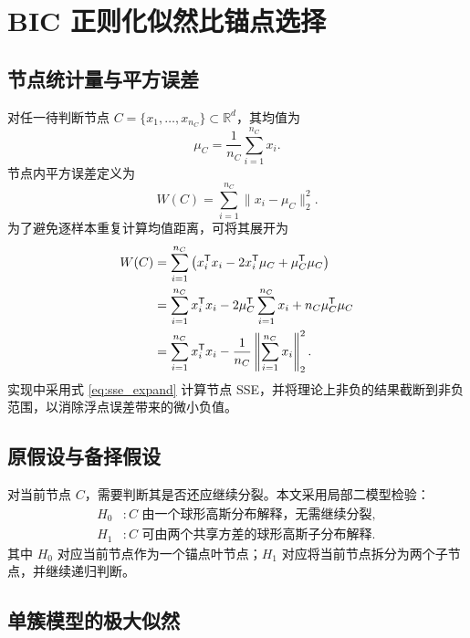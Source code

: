 \documentclass[UTF8,a4paper,12pt,fontset=none]{ctexart}
\newcommand{\R}{\mathbb{R}}
\newcommand{\T}{\mathsf{T}}
\begin{document}
\section{BIC 正则化似然比锚点选择}

\subsection{节点统计量与平方误差}

对任一待判断节点 \(C=\{x_1,\ldots,x_{n_C}\}\subset\R^d\)，其均值为
\begin{equation}
\mu_C=\frac{1}{n_C}\sum_{i=1}^{n_C}x_i .
\end{equation}
节点内平方误差定义为
\begin{equation}
W(C)=\sum_{i=1}^{n_C}\|x_i-\mu_C\|_2^2 .
\end{equation}
为了避免逐样本重复计算均值距离，可将其展开为
\begin{align}
W(C)
&=\sum_{i=1}^{n_C}
\left(x_i^\T x_i-2x_i^\T\mu_C+\mu_C^\T\mu_C\right) \notag\\
&=\sum_{i=1}^{n_C}x_i^\T x_i
-2\mu_C^\T\sum_{i=1}^{n_C}x_i
+n_C\mu_C^\T\mu_C \notag\\
&=\sum_{i=1}^{n_C}x_i^\T x_i
-\frac{1}{n_C}
\left\|\sum_{i=1}^{n_C}x_i\right\|_2^2 .
\label{eq:sse_expand}
\end{align}
实现中采用式 \eqref{eq:sse_expand} 计算节点 SSE，并将理论上非负的结果截断到非负范围，以消除浮点误差带来的微小负值。

\subsection{原假设与备择假设}

对当前节点 \(C\)，需要判断其是否还应继续分裂。本文采用局部二模型检验：
\begin{align}
H_0 &: C \text{ 由一个球形高斯分布解释，无需继续分裂},\\
H_1 &: C \text{ 可由两个共享方差的球形高斯子分布解释}.
\end{align}
其中 \(H_0\) 对应当前节点作为一个锚点叶节点；\(H_1\) 对应将当前节点拆分为两个子节点，并继续递归判断。

\subsection{单簇模型的极大似然}
\end{document}
